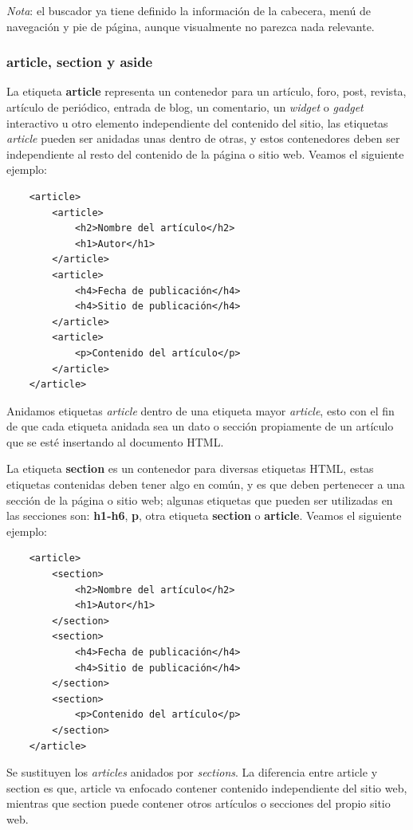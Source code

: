 \textit{Nota}: el buscador ya tiene definido la información de la cabecera, menú de navegación y pie de página, aunque visualmente no parezca nada relevante.


\subsubsection{article, section y aside}
\hspace{0.55cm}La etiqueta \textbf{article} representa un contenedor para un artículo, foro, post, revista, artículo de periódico, entrada de blog, un comentario, un \textit{widget} o \textit{gadget} interactivo u otro elemento independiente del contenido del sitio, las etiquetas \textit{article} pueden ser anidadas unas dentro de otras, y estos contenedores deben ser independiente al resto del contenido de la página o sitio web. Veamos el siguiente ejemplo:
\begin{lstlisting}
    <article>
        <article>
            <h2>Nombre del artículo</h2>
            <h1>Autor</h1>
        </article>
        <article>
            <h4>Fecha de publicación</h4>
            <h4>Sitio de publicación</h4>
        </article>
        <article>
            <p>Contenido del artículo</p>
        </article>
    </article>
\end{lstlisting}

Anidamos etiquetas \textit{article} dentro de una etiqueta mayor \textit{article}, esto con el fin de que cada etiqueta anidada sea un dato o sección propiamente de un artículo que se esté insertando al documento HTML.

La etiqueta \textbf{section} es un contenedor para diversas etiquetas HTML, estas etiquetas contenidas deben tener algo en común, y es que deben pertenecer a una sección de la página o sitio web; algunas etiquetas que pueden ser utilizadas en las secciones son: \textbf{h1-h6}, \textbf{p}, otra etiqueta \textbf{section} o \textbf{article}. Veamos el siguiente ejemplo:
\begin{lstlisting}
    <article>
        <section>
            <h2>Nombre del artículo</h2>
            <h1>Autor</h1>
        </section>
        <section>
            <h4>Fecha de publicación</h4>
            <h4>Sitio de publicación</h4>
        </section>
        <section>
            <p>Contenido del artículo</p>
        </section>
    </article>
\end{lstlisting}

Se sustituyen los \textit{articles} anidados por \textit{sections}. La diferencia entre article y section es que, article va enfocado contener contenido independiente del sitio web, mientras que section puede contener otros artículos o secciones del propio sitio web.

